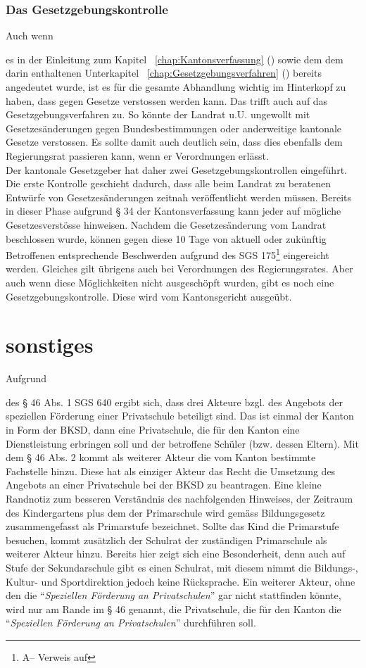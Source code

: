 \documentclass[10pt,parskip]{scrbook}
\newcounter{rz}
\newcommand{\Rz}{\addtocounter{rz}{1}\marginpar{\texttt{\textit{A\arabic{rz}}}}}
\newif\ifFooterInfo
\newcommand{\GNorm}[3]{#1 #2\ifFooterInfo\footnote{A\therz -- Verweis auf \ifstrempty{#3}{\citefield{#1#2}{title}}{\citefield{#1#3}{title}}}}
\begin{document}
\subsection{Das Gesetzgebungskontrolle}
Auch wenn \Rz es in der Einleitung zum Kapitel ~\ref{chap:Kantonsverfassung} () sowie dem dem darin enthaltenen Unterkapitel ~\ref{chap:Gesetzgebungsverfahren} () bereits angedeutet wurde, ist es für die gesamte Abhandlung wichtig im Hinterkopf zu haben, dass gegen Gesetze verstossen werden kann. Das trifft auch auf das Gesetzgebungsverfahren zu. So könnte der Landrat u.U. ungewollt mit Gesetzesänderungen gegen Bundesbestimmungen oder anderweitige kantonale Gesetze verstossen. Es sollte damit auch deutlich sein, dass dies ebenfalls dem Regierungsrat passieren kann, wenn er Verordnungen erlässt.\\

Der kantonale Gesetzgeber hat daher zwei Gesetzgebungskontrollen eingeführt. Die erste Kontrolle geschieht dadurch, dass alle beim Landrat zu beratenen Entwürfe von Gesetzesänderungen zeitnah veröffentlicht werden müssen. Bereits in dieser Phase aufgrund § 34 der Kantonsverfassung kann jeder auf mögliche Gesetzesverstösse hinweisen. Nachdem die Gesetzesänderung vom Landrat beschlossen wurde, können gegen diese 10 Tage von aktuell oder zukünftig Betroffenen entsprechende Beschwerden aufgrund des \GNorm{SGS}{175}{} eingereicht werden. Gleiches gilt übrigens auch bei Verordnungen des Regierungsrates. Aber auch wenn diese Möglichkeiten nicht ausgeschöpft wurden, gibt es noch eine Gesetzgebungskontrolle. Diese wird vom Kantonsgericht ausgeübt. 

\chapter{sonstiges}

Aufgrund \Rz des § 46 Abs. 1 SGS 640 ergibt sich, dass drei Akteure bzgl. des Angebots der speziellen Förderung einer Privatschule beteiligt sind. Das ist einmal der Kanton in Form der BKSD, dann eine Privatschule, die für den Kanton eine Dienstleistung erbringen soll und der betroffene Schüler (bzw. dessen Eltern). Mit dem § 46 Abs. 2 kommt als weiterer Akteur die vom Kanton bestimmte Fachstelle hinzu. Diese hat als einziger Akteur das Recht die Umsetzung des Angebots an einer Privatschule bei der BKSD zu beantragen. Eine kleine Randnotiz zum besseren Verständnis des nachfolgenden Hinweises, der Zeitraum des Kindergartens plus dem der Primarschule wird gemäss Bildungsgesetz zusammengefasst als Primarstufe bezeichnet. Sollte das Kind die Primarstufe besuchen, kommt zusätzlich der Schulrat der zuständigen Primarschule als weiterer Akteur hinzu. Bereits hier zeigt sich eine Besonderheit, denn auch auf Stufe der Sekundarschule gibt es einen Schulrat, mit diesem nimmt die Bildungs-, Kultur- und Sportdirektion jedoch keine Rücksprache. Ein weiterer Akteur, ohne den die "`\textsl{Speziellen Förderung an Privatschulen}"' gar nicht stattfinden könnte, wird nur am Rande im § 46 genannt, die Privatschule, die für den Kanton die "`\textsl{Speziellen Förderung an Privatschulen}"' durchführen soll.
\end{document}
